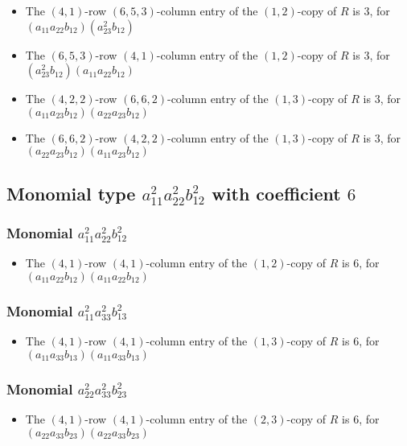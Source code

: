 \documentclass{article}
\begin{document}
\begin{itemize}
\item The $(4, 1)$-row $(6, 5, 3)$-column entry of the $ \left(1, 2\right) $-copy of $R$ is $ 3 $, for $( a_{11} a_{22} b_{12} )( a_{23}^{2} b_{12} )$ 
\item The $(6, 5, 3)$-row $(4, 1)$-column entry of the $ \left(1, 2\right) $-copy of $R$ is $ 3 $, for $( a_{23}^{2} b_{12} )( a_{11} a_{22} b_{12} )$ 
\item The $(4, 2, 2)$-row $(6, 6, 2)$-column entry of the $ \left(1, 3\right) $-copy of $R$ is $ 3 $, for $( a_{11} a_{23} b_{12} )( a_{22} a_{23} b_{12} )$ 
\item The $(6, 6, 2)$-row $(4, 2, 2)$-column entry of the $ \left(1, 3\right) $-copy of $R$ is $ 3 $, for $( a_{22} a_{23} b_{12} )( a_{11} a_{23} b_{12} )$ 
\end{itemize}
\subsection{Monomial type $ a_{11}^{2} a_{22}^{2} b_{12}^{2} $ with coefficient $ 6 $}

\subsubsection{Monomial $ a_{11}^{2} a_{22}^{2} b_{12}^{2} $}

\begin{itemize}
\item The $(4, 1)$-row $(4, 1)$-column entry of the $ \left(1, 2\right) $-copy of $R$ is $ 6 $, for $( a_{11} a_{22} b_{12} )( a_{11} a_{22} b_{12} )$ 
\end{itemize}
\subsubsection{Monomial $ a_{11}^{2} a_{33}^{2} b_{13}^{2} $}

\begin{itemize}
\item The $(4, 1)$-row $(4, 1)$-column entry of the $ \left(1, 3\right) $-copy of $R$ is $ 6 $, for $( a_{11} a_{33} b_{13} )( a_{11} a_{33} b_{13} )$ 
\end{itemize}
\subsubsection{Monomial $ a_{22}^{2} a_{33}^{2} b_{23}^{2} $}

\begin{itemize}
\item The $(4, 1)$-row $(4, 1)$-column entry of the $ \left(2, 3\right) $-copy of $R$ is $ 6 $, for $( a_{22} a_{33} b_{23} )( a_{22} a_{33} b_{23} )$ 
\end{itemize}
\end{document}
